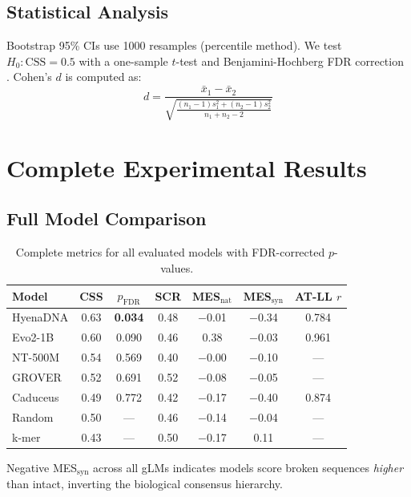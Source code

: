 \documentclass{article}
\newcommand{\css}{\text{CSS}}
\begin{document}
\subsection{Statistical Analysis}

Bootstrap 95\% CIs use 1000 resamples (percentile method).
We test $H_0: \css = 0.5$ with a one-sample $t$-test and Benjamini-Hochberg FDR correction
\citep{benjamini1995controlling}.
Cohen's $d$ is computed as:
\begin{equation}
d = \frac{\bar{x}_1 - \bar{x}_2}{\sqrt{\frac{(n_1-1)s_1^2 + (n_2-1)s_2^2}{n_1+n_2-2}}}
\end{equation}

\section{Complete Experimental Results}
\label{app:results}

\subsection{Full Model Comparison}

\begin{table}[ht]
\caption{Complete metrics for all evaluated models with FDR-corrected $p$-values.}
\label{tab:full_metrics}
\centering\small
\begin{tabular}{lcccccc}
\toprule
Model & CSS & $p_{\text{FDR}}$ & SCR & MES$_\text{nat}$ & MES$_\text{syn}$ & AT-LL $r$ \\
\midrule
HyenaDNA & 0.63 & \textbf{0.034} & 0.48 & $-$0.01 & $-$0.34 & 0.784 \\
Evo2-1B  & 0.60 & 0.090          & 0.46 &   0.38  & $-$0.03 & 0.961 \\
NT-500M  & 0.54 & 0.569          & 0.40 & $-$0.00 & $-$0.10 & --- \\
GROVER   & 0.52 & 0.691          & 0.52 & $-$0.08 & $-$0.05 & --- \\
Caduceus & 0.49 & 0.772          & 0.42 & $-$0.17 & $-$0.40 & 0.874 \\
\midrule
Random   & 0.50 & ---            & 0.46 & $-$0.14 & $-$0.04 & --- \\
k-mer    & 0.43 & ---            & 0.50 & $-$0.17 &   0.11  & --- \\
\bottomrule
\end{tabular}
\end{table}

Negative MES$_\text{syn}$ across all gLMs indicates models score broken sequences
\emph{higher} than intact, inverting the biological consensus hierarchy.
\end{document}
